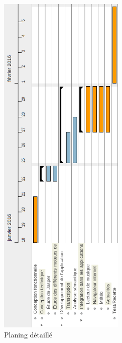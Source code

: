 \documentclass[12pt]{article}
\begin{document}
    \begin{figure}[H]
        \centering
        \includegraphics[width=6cm]{gantt.png}
        \caption{Planing détaillé}
    \end{figure}
\end{document}

